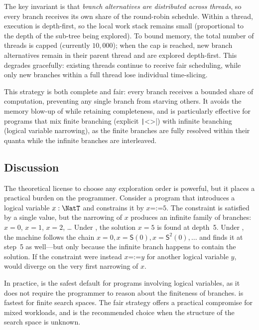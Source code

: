 The key invariant is that \emph{branch alternatives are distributed across
threads}, so every branch receives its own share of the round-robin schedule.
Within a thread, execution is depth-first, so the local work stack remains
small (proportional to the depth of the sub-tree being explored). To bound
memory, the total number of threads is capped (currently $10{,}000$); when the
cap is reached, new branch alternatives remain in their parent thread and are
explored depth-first. This degrades gracefully: existing threads continue to
receive fair scheduling, while only new branches within a full thread lose
individual time-slicing.

This strategy is both complete and fair: every branch receives a bounded share
of computation, preventing any single branch from starving others. It avoids
the memory blow-up of \BFS{} while retaining completeness, and is particularly
effective for programs that mix finite branching (explicit
\texttt|<>|) with infinite branching (logical variable narrowing),
as the finite branches are fully resolved within their quanta while the
infinite branches are interleaved.

\subsection{Discussion}

The theoretical license to choose any exploration order is powerful, but it
places a practical burden on the programmer. Consider a program that introduces
a logical variable $x : \NatT$ and constrains it by $x \mathbin{\texttt{=:=}}
5$. The constraint is satisfied by a single value, but the narrowing of $x$
produces an infinite family of branches: $x = 0$, $x = 1$, $x = 2$, \ldots
Under \BFS{}, the solution $x = 5$ is found at depth~5. Under \DFS{}, the
machine follows the chain $x = 0, x = \textsf{S}(0), x = \textsf{S}^2(0),
\ldots$ and finds it at step~5 as well---but only because the infinite branch
happens to contain the solution. If the constraint were instead $x
\mathbin{\texttt{=:=}} y$ for another logical variable $y$, \DFS{} would
diverge on the very first narrowing of $x$.

In practice, \BFS{} is the safest default for programs involving logical
variables, as it does not require the programmer to reason about the finiteness
of branches. \DFS{} is fastest for finite search spaces. The fair strategy
offers a practical compromise for mixed workloads, and is the recommended
choice when the structure of the search space is unknown.
